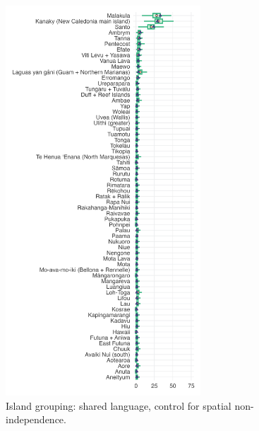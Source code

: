 \documentclass[unnumsec,webpdf,modern,medium]{oup-authoring-template}
\begin{document}
\begin{figure}[ht]
\includegraphics[width=0.65\textwidth]{brms_predict_medium_control_spatial.png}
\caption{Island grouping: shared language, control for spatial non-independence. }
\label{brms_predict_medium_control_spatial}
\end{figure}
\end{document}
